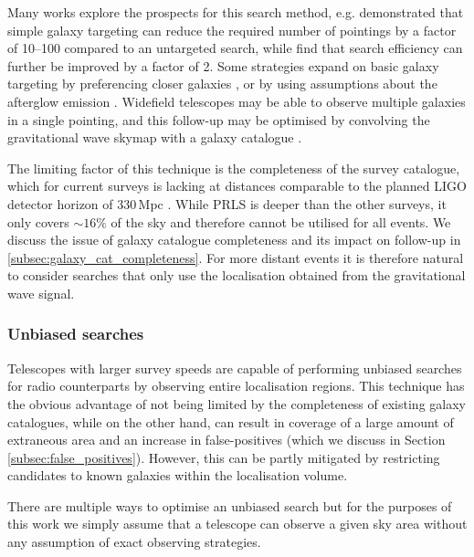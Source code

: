 Many works explore the prospects for this search method, e.g. \citet{2016ApJ...820..136G} demonstrated that simple galaxy targeting can reduce the required number of pointings by a factor of 10--100 compared to an untargeted search, while \citet{2018MNRAS.478..692C} find that search efficiency can further be improved by a factor of 2. Some strategies expand on basic galaxy targeting by preferencing closer galaxies \citep{2017ApJ...848L..33A}, or by using assumptions about the afterglow emission \citep{2016ExA....42..165C,2017ApJ...846...62S}. Widefield telescopes may be able to observe multiple galaxies in a single pointing, and this follow-up may be optimised by convolving the gravitational wave skymap with a galaxy catalogue \citep{2016MNRAS.462.1591E}.

The limiting factor of this technique is the completeness of the survey catalogue, which for current surveys is lacking at distances comparable to the planned LIGO detector horizon of $330\,$Mpc \citep{2018LRR....21....3A}. While PRLS is deeper than the other surveys, it only covers $\sim 16\%$ of the sky and therefore cannot be utilised for all events. We discuss the issue of galaxy catalogue completeness and its impact on follow-up in \ref{subsec:galaxy_cat_completeness}. For more distant events it is therefore natural to consider searches that only use the localisation obtained from the gravitational wave signal.


\subsubsection{Unbiased searches}
Telescopes with larger survey speeds are capable of performing unbiased searches for radio counterparts by observing entire localisation regions. This technique has the obvious advantage of not being limited by the completeness of existing galaxy catalogues, while on the other hand, can result in coverage of a large amount of extraneous area and an increase in false-positives (which we discuss in Section \ref{subsec:false_positives}). However, this can be partly mitigated by restricting candidates to known galaxies within the localisation volume.

There are multiple ways to optimise an unbiased search \citep[e.g.][]{2016A&A...592A..82G,2017PASP..129k4503G,2019PASA...36...19D,2020arXiv200304839G} but for the purposes of this work we simply assume that a telescope can observe a given sky area without any assumption of exact observing strategies.


